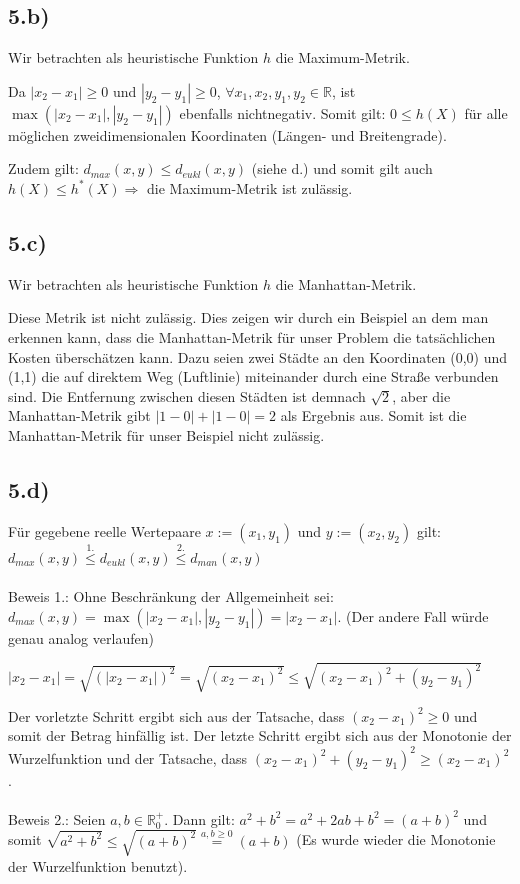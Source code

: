 \documentclass[a4paper]{article}
\newcommand{\IR}{\mathbb{R}}
\begin{document}
\subsection*{5.b)}
Wir betrachten als heuristische Funktion $h$ die Maximum-Metrik.

Da $|x_2-x_1| \geq 0$ und $|y_2-y_1| \geq 0$, $\forall x_1,x_2,y_1,y_2 \in \IR$, ist $\max(|x_2-x_1|,|y_2-y_1|)$ ebenfalls nichtnegativ. Somit gilt: $0 \leq h(X)$ f\"ur alle m\"oglichen zweidimensionalen Koordinaten (L\"angen- und Breitengrade).

Zudem gilt: $d_{max}(x,y) \leq d_{eukl}(x,y)$ (siehe d.) und somit gilt auch $h(X) \leq h^\ast(X) \Rightarrow$ die Maximum-Metrik ist zul\"assig.

\subsection*{5.c)}
Wir betrachten als heuristische Funktion $h$ die Manhattan-Metrik.

Diese Metrik ist nicht zul\"assig. Dies zeigen wir durch ein Beispiel an dem man erkennen kann, dass die Manhattan-Metrik f\"ur unser Problem die tats\"achlichen Kosten \"ubersch\"atzen kann. Dazu seien zwei St\"adte an den Koordinaten (0,0) und (1,1) die auf direktem Weg (Luftlinie) miteinander durch eine Stra{\ss}e verbunden sind.
Die Entfernung zwischen diesen St\"adten ist demnach $\sqrt{2}$, aber die Manhattan-Metrik gibt $|1 - 0| + |1 - 0| = 2$ als Ergebnis aus. Somit ist die Manhattan-Metrik f\"ur unser Beispiel nicht zul\"assig.

\subsection*{5.d)}
F\"ur gegebene reelle Wertepaare $x:=(x_1,y_1)$ und $y:=(x_2,y_2)$ gilt:
$d_{max}(x,y) \stackrel{1.}{\leq} d_{eukl}(x,y) \stackrel{2.}{\leq} d_{man}(x,y)$\\
\\
Beweis 1.: Ohne Beschr\"ankung der Allgemeinheit sei: $d_{max}(x,y) = \max(|x_2- x_1|,|y_2- y_1|) = |x_2- x_1|$.
(Der andere Fall w\"urde genau analog verlaufen)

$|x_2-x_1|=\sqrt{(|x_2-x_1|)^2}=\sqrt{(x_2-x_1)^2}\leq\sqrt{(x_2-x_1)^2+ (y_2-y_1)^2}$

Der vorletzte Schritt ergibt sich aus der Tatsache, dass $(x_2-x_1)^2\geq0$ und somit der
Betrag hinf\"allig ist. Der letzte Schritt ergibt sich aus der Monotonie der Wurzelfunktion
und der Tatsache, dass $(x_2- x_1)^2+(y_2- y_1)^2\geq(x_2- x_1)^2$.\\
\\
Beweis 2.: Seien $a,b \in \IR^+_0$. Dann gilt: $a^2+ b^2= a^2+ 2ab + b^2= (a + b)^2$ und somit $\sqrt{a^2+b^2}\leq\sqrt{(a + b)^2} \stackrel{a,b\geq0}{=}(a + b)$ (Es wurde wieder die Monotonie der Wurzelfunktion
benutzt).
\end{document}
